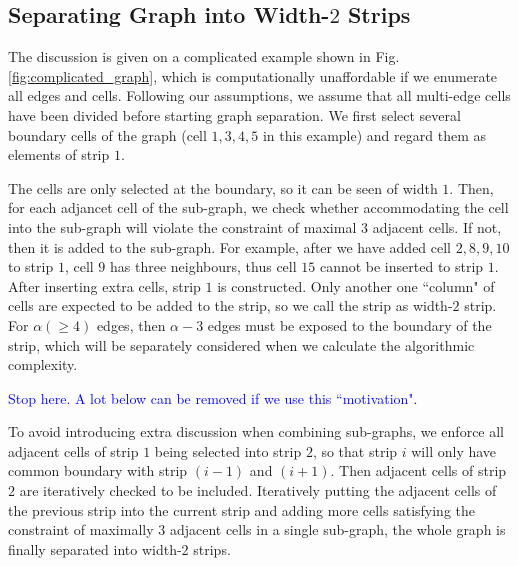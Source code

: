 \documentclass[conference]{IEEEtran}
\begin{document}
\subsection{Separating Graph into Width-$2$ Strips}
The discussion is given on a complicated example shown in Fig.\ref{fig:complicated_graph}, which is computationally unaffordable if we enumerate all edges and cells. Following our assumptions, we assume that all multi-edge cells have been divided before starting graph separation. 
We first select several boundary cells of the graph (cell $1, 3, 4, 5$ in this example) and regard them as elements of strip $1$.

The cells are only selected at the boundary, so it can be seen of width $1$. 
Then, for each adjancet cell of the sub-graph, we check whether accommodating the cell into the sub-graph will violate the constraint of maximal $3$ adjacent cells. If not, then it is added to the sub-graph. 
For example, after we have added cell $2, 8, 9, 10$ to strip $1$, cell $9$ has three neighbours, thus cell $15$ cannot be inserted to strip $1$. 
After inserting extra cells, strip $1$ is constructed. 
Only another one ``column" of cells are expected to be added to the strip, so we call the strip as width-$2$ strip. 
For $\alpha(\geq 4)$ edges, then $\alpha-3$ edges must be exposed to the boundary of the strip, which will be separately considered when we calculate the algorithmic complexity. 

\textcolor{blue}{Stop here. A lot below can be removed if we use this ``motivation". }

To avoid introducing extra discussion when combining sub-graphs, we enforce all adjacent cells of strip $1$ being selected into strip $2$, so that strip $i$ will only have common boundary with strip $(i-1)$ and $(i+1)$. 
Then adjacent cells of strip $2$ are iteratively checked to be included. 
Iteratively putting the adjacent cells of the previous strip into the current strip and adding more cells satisfying the constraint of maximally $3$ adjacent cells in a single sub-graph, the whole graph is finally separated into width-$2$ strips. 
\end{document}
